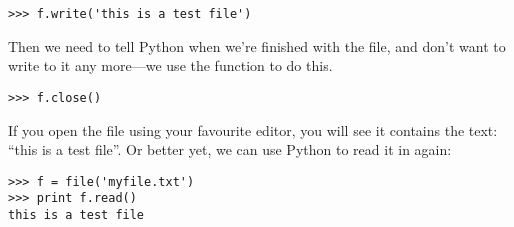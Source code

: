 \begin{listing}
\begin{verbatim}
>>> f.write('this is a test file')
\end{verbatim}
\end{listing}

Then we need to tell Python when we're finished with the file, and don't want to write to it any more---we use the function  to do this.

\begin{listing}
\begin{verbatim}
>>> f.close()
\end{verbatim}
\end{listing}

If you open the file using your favourite editor, you will see it contains the text: ``this is a test file''.  Or better yet, we can use Python to read it in again:

\begin{listing}
\begin{verbatim}
>>> f = file('myfile.txt')
>>> print f.read()
this is a test file
\end{verbatim}
\end{listing}

\newpage